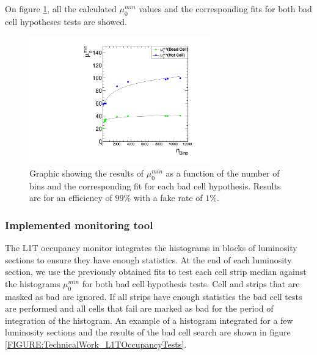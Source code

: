On figure \ref{FIGURE:TechnicalWork_L1TOccupancyMuMin}, all the calculated $\mu_0^{min}$ values and the corresponding fits for both bad cell hypotheses tests are showed.

\begin{figure}[!htb]
\centering
\includegraphics[width=0.70\textwidth]{Chapter03/L1TOnline/Images/L1TOccupancy_MuMin.pdf}
\caption[Graphic showing the results of $\mu_0^{min}$ as a function of the number of bins and the corresponding fit for each bad cell hypothesis.]
{Graphic showing the results of $\mu_0^{min}$ as a function of the number of bins and the corresponding fit for each bad cell hypothesis. Results are for an efficiency of $99\%$ with a fake rate of $1\%$.}
\label{FIGURE:TechnicalWork_L1TOccupancyMuMin}
\end{figure}

\subsubsection{Implemented monitoring tool}


The \gls{L1T} occupancy monitor integrates the histograms in blocks of luminosity sections to ensure they have enough statistics. At the end of each luminosity section, we use the previously obtained fits to test each cell strip median against the histograms $\mu_0^{min}$ for both bad cell hypothesis tests. Cell and strips that are masked as bad are ignored. If all strips have enough statistics the bad cell tests are performed and all cells that fail are marked as bad for the period of integration of the histogram. An example of a histogram integrated for a few luminosity sections and the results of the bad cell search are shown in figure \ref{FIGURE:TechnicalWork_L1TOccupancyTests}.

